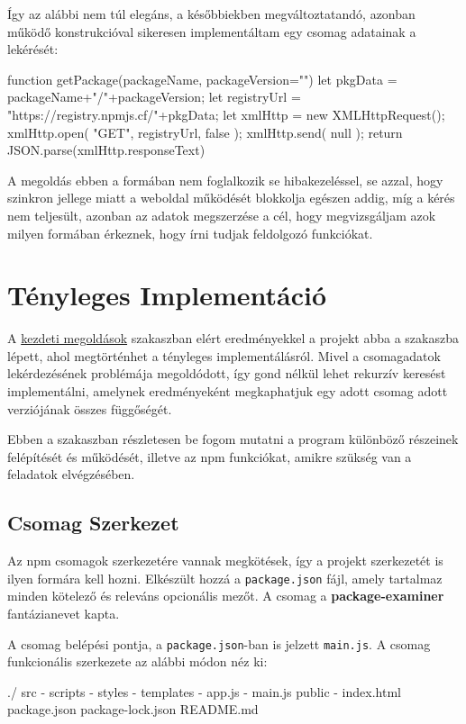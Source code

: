 Így az alábbi nem túl elegáns, a későbbiekben megváltoztatandó, azonban működő konstrukcióval sikeresen implementáltam egy csomag adatainak a lekérését:

\begin{cpp}
function getPackage(packageName, packageVersion=""){
	let pkgData = packageName+"/"+packageVersion;
	let registryUrl = "https://registry.npmjs.cf/"+pkgData;
	let xmlHttp = new XMLHttpRequest();
	xmlHttp.open( "GET", registryUrl, false );
	xmlHttp.send( null );
	return JSON.parse(xmlHttp.responseText)
}
\end{cpp}

A megoldás ebben a formában nem foglalkozik se hibakezeléssel, se azzal, hogy szinkron jellege miatt a weboldal működését blokkolja egészen addig, míg a kérés nem teljesült, azonban az adatok megszerzése a cél, hogy megvizsgáljam azok milyen formában érkeznek, hogy írni tudjak feldolgozó funkciókat.

\section{Tényleges Implementáció} 

A \hyperlink{section.4.1}{kezdeti megoldások} szakaszban elért eredményekkel a projekt abba a szakaszba lépett, ahol megtörténhet a tényleges implementálásról. Mivel a csomagadatok lekérdezésének problémája megoldódott, így gond nélkül lehet rekurzív keresést implementálni, amelynek eredményeként megkaphatjuk egy adott csomag adott verziójának összes függőségét.

Ebben a szakaszban részletesen be fogom mutatni a program különböző részeinek felépítését és működését, illetve az npm funkciókat, amikre szükség van a feladatok elvégzésében.

\subsection{Csomag Szerkezet}
Az npm csomagok szerkezetére vannak megkötések, így a projekt szerkezetét is ilyen formára kell hozni. Elkészült hozzá a \texttt{package.json} fájl, amely tartalmaz minden kötelező és releváns opcionális mezőt. A csomag a \textbf{package-examiner} fantázianevet kapta.   

A csomag belépési pontja, a \texttt{package.json}-ban is jelzett \texttt{main.js}. A csomag funkcionális szerkezete az alábbi módon néz ki:

\begin{cpp}
./	
	src
		- scripts
		- styles
		- templates
		- app.js
		- main.js
	public
		- index.html
	package.json
	package-lock.json
	README.md	
\end{cpp}

